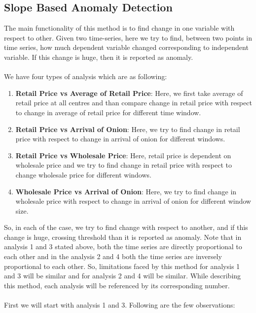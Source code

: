 \documentclass[a4paper,10pt]{report}
\begin{document}
\subsection{Slope Based Anomaly Detection}
	
		The main functionality of this method is to find change in one variable with respect to other. Given two time-series, here we try to find, between two points in time series, how much dependent variable changed corresponding to independent variable. If this change is huge, then it is reported as anomaly.\\
		\\
		We have four types of analysis which are as following:
		\begin{enumerate}
			\item \textbf{Retail Price vs Average of Retail Price}: Here, we first take average of retail price at all centres and than compare change in retail price with respect to change in average of retail price for different time window.			
			\item \textbf{Retail Price vs Arrival of Onion}: Here, we try to find change in retail price with respect to change in arrival of onion for different windows. 
			\item \textbf{Retail Price vs Wholesale Price}: Here, retail price is dependent on wholesale price and we try to find change in retail price with respect to change wholesale price for different windows.
			\item \textbf{Wholesale Price vs Arrival of Onion}: Here, we try to find change in wholesale price with respect to change in arrival of onion for different window size.
		\end{enumerate}
		
		So, in each of the case, we try to find change with respect to another, and if this change is huge, crossing threshold than it is reported as anomaly. Note that in analysis 1 and 3 stated above, both the time series are directly proportional to each other and in the analysis 2 and 4 both the time series are inversely proportional to each other. So, limitations faced by this method for analysis 1 and 3 will be similar and for analysis 2 and 4 will be similar. While describing this method, each analysis will be referenced by its corresponding number.\\
		\\
		First we will start with analysis 1 and 3. Following are the few observations:
		
\end{document}
